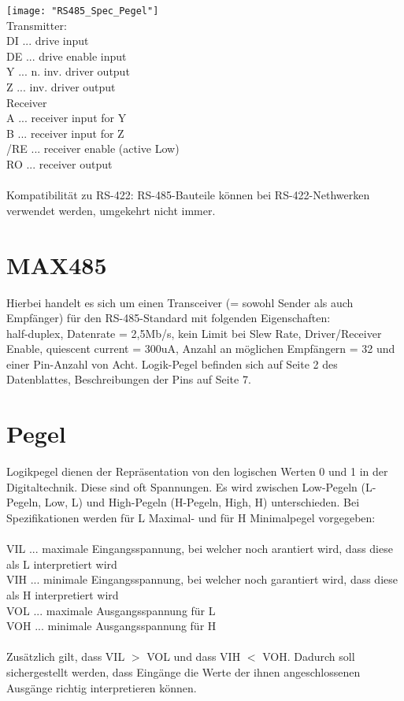 \documentclass[11pt]{report}
\begin{document}
		\texttt{[image: "RS485\_Spec\_Pegel"]}\\
		Transmitter:\\
		DI ... drive input\\
		DE ... drive enable input\\
		Y ... n. inv. driver output\\
		Z ... inv. driver output\\
		Receiver\\
		A ... receiver input for Y\\
		B ... receiver input for Z\\
		/RE ... receiver enable (active Low)\\
		RO ... receiver output\\
		\\Kompatibilität zu RS-422: RS-485-Bauteile können bei RS-422-Nethwerken verwendet werden, umgekehrt nicht immer.
	\section{MAX485}
		Hierbei handelt es sich um einen Transceiver (= sowohl Sender als auch Empfänger) für den RS-485-Standard mit folgenden Eigenschaften:\\
		half-duplex, Datenrate = 2,5Mb/s, kein Limit bei Slew Rate, Driver/Receiver Enable, quiescent current = 300uA, Anzahl an möglichen Empfängern = 32 und einer Pin-Anzahl von Acht. Logik-Pegel befinden sich auf Seite 2 des Datenblattes, Beschreibungen der Pins auf Seite 7.
	\section{Pegel}
		Logikpegel dienen der Repräsentation von den logischen Werten 0 und 1 in der Digitaltechnik. Diese sind oft Spannungen. Es wird zwischen Low-Pegeln (L-Pegeln, Low, L) und High-Pegeln (H-Pegeln, High, H) unterschieden. Bei Spezifikationen werden für L Maximal- und für H Minimalpegel vorgegeben:\\
		\\V{\tiny IL} ... maximale Eingangsspannung, bei welcher noch arantiert wird, dass diese als L interpretiert wird\\
		V{\tiny IH} ... minimale Eingangsspannung, bei welcher noch garantiert wird, dass diese als H interpretiert wird\\
		V{\tiny OL} ... maximale Ausgangsspannung für L\\
		V{\tiny OH} ... minimale Ausgangsspannung für H\\
		\\Zusätzlich gilt, dass V{\tiny IL} $>$ V{\tiny OL} und dass V{\tiny IH} $<$ V{\tiny OH}. Dadurch soll sichergestellt werden, dass Eingänge die Werte der ihnen angeschlossenen Ausgänge richtig interpretieren können.
\end{document}
